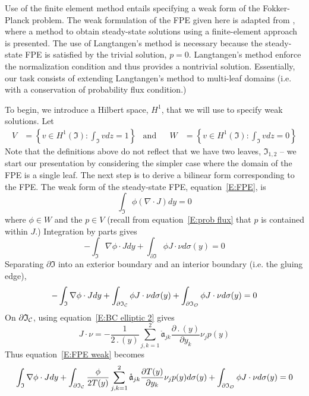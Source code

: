 Use of the finite element method entails specifying a weak form of the Fokker-Planck problem. The weak formulation of the FPE given here is adapted from \citet{langtangen91:_fokker_planck}, where a method to obtain steady-state solutions using a finite-element approach is presented. The use of Langtangen's method is necessary because the steady-state FPE is satisfied by the trivial solution, $p=0$. Langtangen's method enforce the normalization condition and thus provides a nontrivial solution.
Essentially, our task consists of extending Langtangen's method to multi-leaf domains (i.e. with a conservation of probability flux condition.)

To begin, we introduce a Hilbert space, $H^1$, that we will use to specify weak solutions. Let
\begin{align}
V &= \left\{v \in H^1(\mathfrak I): \int_\mathfrak I v dz = 1\right\} &\text{and}&& W &= \left\{v \in H^1(\mathfrak I): \int_\mathfrak I v dz = 0\right\}
\label{E:weak spaces}
\end{align}
Note that the definitions above do not reflect that we have two leaves, $\mathfrak{I}_{1,2}$ -- we start our presentation by considering the simpler case where the domain of the FPE is a single leaf. The next step is to derive a bilinear form corresponding to the FPE. The weak form of the steady-state FPE, equation~\eqref{E:FPE}, is
\[
\int_\mathfrak I \phi (\nabla \cdot J) dy = 0
\]
where $\phi \in W$ and the $p \in V$ (recall from equation~\eqref{E:prob flux} that $p$ is contained within $J$.) Integration by parts gives
\[
-\int_\mathfrak I \nabla \phi \cdot J dy + \int_{\partial \mathfrak I} \phi J \cdot \nu d\sigma(y) = 0
\]
Separating $\partial \mathfrak I$ into an exterior boundary and an interior boundary (i.e. the gluing edge),
\begin{equation}
-\int_\mathfrak I \nabla \phi \cdot J dy + \int_{\partial \mathfrak I_\mathcal C} \phi J \cdot \nu d\sigma(y) + \int_{\partial \mathfrak I_\mathcal{O}} \phi J \cdot \nu d\sigma(y) = 0
\label{E:FPE weak}
\end{equation}
On $\partial \mathfrak I_\mathcal C$, using equation~\eqref{E:BC elliptic 2} gives
\[
J \cdot \nu = -\frac{1}{2 \period(y)} \sum_{j,k=1}^2 \mathring{\mathfrak{a}}_{jk} \frac{\partial \period(y)}{\partial y_k} \nu_j p(y)
\]
Thus equation~\eqref{E:FPE weak} becomes
\begin{equation}
\int_\mathfrak I \nabla \phi \cdot J dy + \int_{\partial \mathfrak I_\mathcal C} \frac{\phi}{2 T(y)} \sum_{j,k=1}^2 \mathring{\mathfrak{a}}_{jk} \frac{\partial T(y)}{\partial y_k} \nu_j p(y) d\sigma(y) + \int_{\partial \mathfrak I_\mathcal{O}} \phi J \cdot \nu d\sigma(y) = 0
\label{E:FPE weak 2}
\end{equation}
